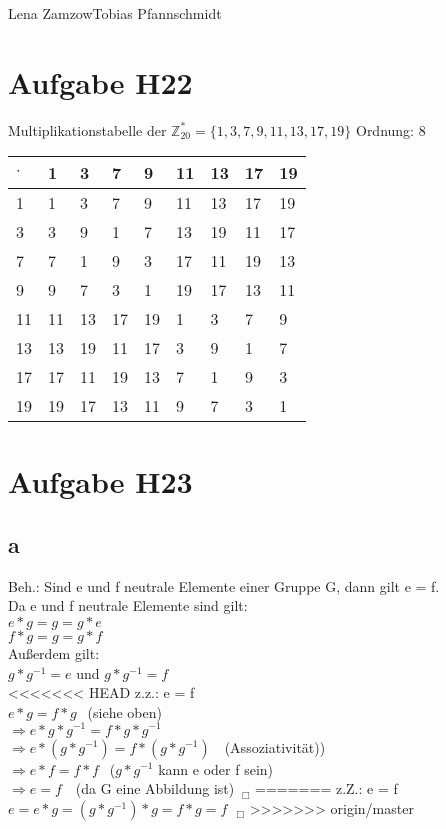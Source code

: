 \documentclass[11pt,a4paper]{article}
\begin{document}
                {Lena Zamzow}{Tobias Pfannschmidt}{}{}{}


\section*{Aufgabe H22}
Multiplikationstabelle der $\mathbb{Z}^{*}_{20} = \{1,3,7,9,11,13,17,19\}$ Ordnung: 8\\
\begin{center}
	\begin{tabular}{ | l | l | l | l | l | l | l| l|l|}
		\hline 
		$\cdot$&1&3&7&9&11&13&17&19 \\ \hline \hline		
		1&1&3&7&9&11&13&17&19 \\ \hline 	
		3&3&9&1&7&13&19&11&17 \\ \hline
		7&7&1&9&3&17&11&19&13\\ \hline	
		9&9&7&3&1&19&17&13&11 \\ \hline
		11&11&13&17&19&1&3&7&9 \\ \hline
		13&13&19&11&17&3&9&1&7 \\ \hline
		17&17&11&19&13&7&1&9&3 \\ \hline
		19&19&17&13&11&9&7&3&1 \\ \hline 
	\end{tabular}
\end{center}
\section*{Aufgabe H23}
\subsection*{a}
Beh.: Sind e und f neutrale Elemente einer Gruppe G, dann gilt e = f. \\

Da e und f neutrale Elemente sind gilt: \\
$e \ast g = g = g \ast e$ \\
$f \ast g = g = g \ast f$ \\
Außerdem gilt: \\
$g \ast g^{-1} = e$ und $g \ast g^{-1} = f$ \\

<<<<<<< HEAD
z.z.: e = f \\
$ e \ast g = f \ast g ~~$   (siehe oben) \\
$\Rightarrow e \ast g \ast g^{-1} = f \ast g \ast g^{-1}~~$ \\
$\Rightarrow e \ast (g \ast g^{-1}) = f \ast (g \ast g^{-1})~~~$   (Assoziativität))  \\
$\Rightarrow e \ast f = f \ast f ~~$ ($g \ast g^{-1}$ kann e oder f sein) \\
$\Rightarrow e = f ~~~$ (da G eine Abbildung ist) $~_\Box$
=======
z.Z.: e = f \\
$ e = e \ast g = (g \ast g^{-1}) \ast  g = f \ast  g = f ~~~_\Box$
>>>>>>> origin/master
\end{document}
